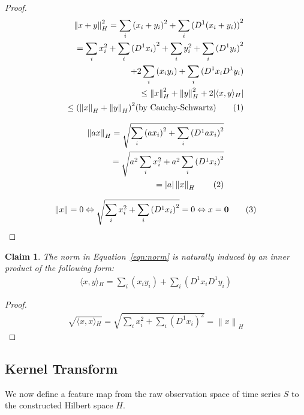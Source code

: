 \documentclass[a4paper]{article}
\newcommand\numberthis{\addtocounter{equation}{1}\tag{\theequation}}
\newcommand{\norm}[1]{\left\lVert#1\right\rVert}
\newcommand{\innerproduct}[2]{\langle{}#1,#2\rangle{}}
\theoremstyle{def}
\theoremstyle{thm}
\newtheorem{claim}[proposition]{Claim}
\begin{document}
\begin{proof}
    \begin{align*}
        \norm{x + y}^2_H = \sum\limits_i{(x_i + y_i)}^2 + \sum\limits_i{(D^1 (x_i + y_i))}^2 \\
        = \sum\limits_i{x_i^2} + \sum\limits_i{(D^1 x_i)}^2 + \sum\limits_i{y_i^2} + \sum\limits_i{(D^1 y_i)}^2\\
        + 2 \sum\limits_i{(x_i y_i)} + \sum\limits_i{(D^1 x_i D^1 y_i)} \\
        \le \norm{x}^2_H + \norm{y}^2_H + 2 |\innerproduct{x}{y}_H|\\
        \le {(\norm{x}_H + \norm{y}_H)}^2 (\textnormal{by Cauchy-Schwartz})\numberthis
    \end{align*}

    \begin{align*}
        \norm{a x}_H = \sqrt{\sum\limits_i{(a x_i)}^2 + \sum\limits_i{(D^1 a x_i)}^2}\\
        = \sqrt{a^2 \sum\limits_i{x_i^2} + a^2 \sum\limits_i{(D^1 x_i)}^2}\\
        = |a| \norm{x}_H \numberthis
    \end{align*}

    \begin{align*}
        \norm{x} = 0 \Leftrightarrow \sqrt{\sum\limits_i{x_i^2} + \sum\limits_i{(D^1 x_i)}^2} = 0\Leftrightarrow x = \bm{0} \numberthis
    \end{align*}
\end{proof}

\begin{claim}
    The norm in Equation~\ref{eqn:norm} is naturally induced by an inner product of the following form:
    \begin{align}
        \innerproduct{x}{y}_H = \sum\limits_i(x_i y_i) + \sum\limits_i(D^1 x_i D^1 y_i)
    \end{align}
\end{claim}

\begin{proof}
    \begin{align*}
        \sqrt{\innerproduct{x}{x}_H} = \sqrt{\sum\limits_i{x_i^2} + \sum\limits_i{(D^1 x_i)}^2} = \norm{x}_H
    \end{align*}
\end{proof}

\subsection{Kernel Transform}
We now define a feature map from the raw observation space of time series $S$ to the constructed Hilbert space $H$.
\end{document}
